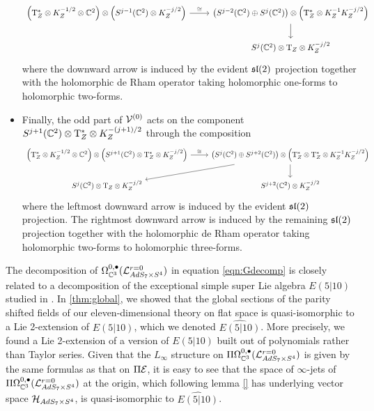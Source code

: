 \begin{itemize}
\begin{equation}
\begin{tikzcd}
\left(\T^*_Z \otimes K^{-1/2}_Z \otimes \C^2\right) \otimes \left(S^{j-1}(\C^2) \otimes K^{-j/2}_Z\right) \ar[r,"\cong"] & \left(S^{j-2}(\C^2) \oplus S^{j}(\C^2)\right) \otimes \left(\T^*_Z \otimes K^{-1}_Z K^{-j/2}_Z\right) \ar[d] \\
& S^{j}(\C^2) \otimes \T_Z \otimes K^{-j/2}_Z
\end{tikzcd}
\end{equation}
where the downward arrow is induced by the evident $\mathfrak{sl}(2)$ projection together with the holomorphic de Rham operator taking holomorphic one-forms to holomorphic two-forms. 
\item Finally, the odd part of $\mathcal{V}^{(0)}$ acts on the component $S^{j+1}(\mathbb{C}^2) \otimes {\mathrm{T}}^*_Z \otimes K^{-(j+1)/2}_Z$ through the composition
\begin{equation}
\begin{tikzcd}
\left(\T^*_Z \otimes K^{-1/2}_Z \otimes \C^2\right) \otimes \left(S^{j+1}(\C^2) \otimes \T^*_Z \otimes K^{-j/2}_Z\right) \ar[r,"\cong"] & \left(S^{j}(\C^2) \oplus S^{j+2}(\C^2)\right) \otimes \left(\T^*_Z \otimes \T^*_Z \otimes K^{-1}_Z K^{-j/2}_Z\right) \ar[dl] \ar[d] \\
S^j (\C^2) \otimes \T_Z \otimes K_Z^{-j/2} & S^{j+2}(\C^2)  \otimes K^{-j/2}_Z
\end{tikzcd}
\end{equation}
where the leftmost downward arrow is induced by the evident $\mathfrak{sl}(2)$ projection.
The rightmost downward arrow is induced by the remaining $\mathfrak{sl}(2)$ projection together with the holomorphic de Rham operator taking holomorphic two-forms to holomorphic three-forms.
\end{itemize}
\fi

\parsec[s:kacrelation]

The decomposition of $\Omega^{0,\bullet}_{\mathbb{C}^3} (\mathcal{L}^{r=0}_{AdS_7\times S^4} )$ in equation \eqref{eqn:Gdecomp} is closely related to a decomposition of the exceptional simple super Lie algebra $E(5|10)$ studied in \cite{KR2}. In \ref{thm:global}, we showed that the global sections of the parity shifted fields of our eleven-dimensional theory on flat space is quasi-isomorphic to a Lie 2-extension of $E(5|10)$, which we denoted $\widehat{E(5|10)}$. More precisely, we found a Lie 2-extension of a version of $E(5|10)$ built out of polynomials rather than Taylor series. Given that the $L_\infty$ structure on $\Pi \Omega^{0,\bullet}_{\mathbb{C}^3} (\mathcal{L}^{r=0}_{AdS_7\times S^4} )$ is given by the same formulas as that on $\Pi \mathcal{E}$, it is easy to see that the space of $\infty$-jets of $\Pi \Omega^{0,\bullet}_{\mathbb{C}^3} (\mathcal{L}^{r=0}_{AdS_7\times S^4} )$ at the origin, which following lemma \ref{} has underlying vector space $\mathcal{H}_{AdS_7\times S^4}$, is quasi-isomorphic to $\widehat{E(5|10)}$. 

